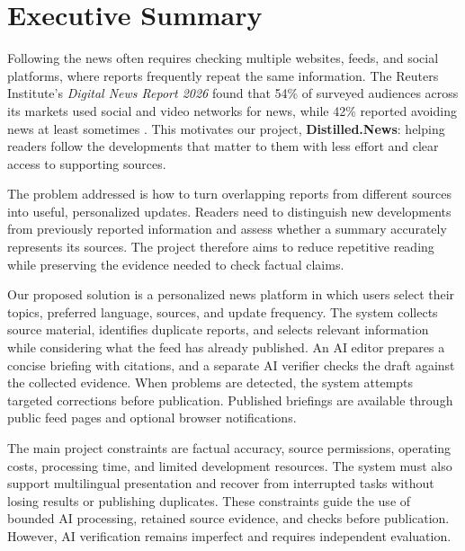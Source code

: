 \chapter*{Executive Summary}

Following the news often requires checking multiple websites, feeds, and social platforms, where reports frequently repeat the same information. The Reuters Institute's \textit{Digital News Report 2026} found that 54\% of surveyed audiences across its markets used social and video networks for news, while 42\% reported avoiding news at least sometimes \cite{reuters2026}. This motivates our project, \textbf{Distilled.News}: helping readers follow the developments that matter to them with less effort and clear access to supporting sources.

The problem addressed is how to turn overlapping reports from different sources into useful, personalized updates. Readers need to distinguish new developments from previously reported information and assess whether a summary accurately represents its sources. The project therefore aims to reduce repetitive reading while preserving the evidence needed to check factual claims.

Our proposed solution is a personalized news platform in which users select their topics, preferred language, sources, and update frequency. The system collects source material, identifies duplicate reports, and selects relevant information while considering what the feed has already published. An AI editor prepares a concise briefing with citations, and a separate AI verifier checks the draft against the collected evidence. When problems are detected, the system attempts targeted corrections before publication. Published briefings are available through public feed pages and optional browser notifications.

The main project constraints are factual accuracy, source permissions, operating costs, processing time, and limited development resources. The system must also support multilingual presentation and recover from interrupted tasks without losing results or publishing duplicates. These constraints guide the use of bounded AI processing, retained source evidence, and checks before publication. However, AI verification remains imperfect and requires independent evaluation.

